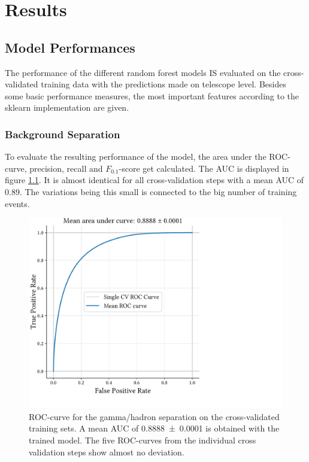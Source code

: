\chapter{Results}\label{Results}

\section{Model Performances}

The performance of the different random forest models IS evaluated on
the cross-validated training data with the predictions made on
telescope level.
Besides some basic performance measures, the most important features
according to the sklearn implementation are given.

\subsection{Background Separation}
\label{Gamma-/Hadron-Separation}



To evaluate the resulting performance of the model, the area under the ROC-curve, precision, recall and
$F_{\num{0.1}}$-score get calculated.
The AUC is displayed in figure \ref{fig:gh_roc}.
It is almost identical for all cross-validation steps with
a mean AUC of \num{0.89}. The variations being this small is connected to the
big number of training events.

\begin{figure}
    \centering
    \captionsetup{width=0.9\linewidth}
    \hspace*{0.1\textwidth}\includegraphics[page=1, width=.6\textwidth]{../analysis/plots/cross_val_sep_perf_plot.pdf}
    \caption{ROC-curve for the gamma/hadron separation on the cross-validated training sets.
    A mean AUC of \num{0.8888 \pm 0.0001} is obtained with the trained model.
    The five ROC-curves from the individual cross validation steps show almost no deviation.}
    \label{fig:gh_roc}
\end{figure}

